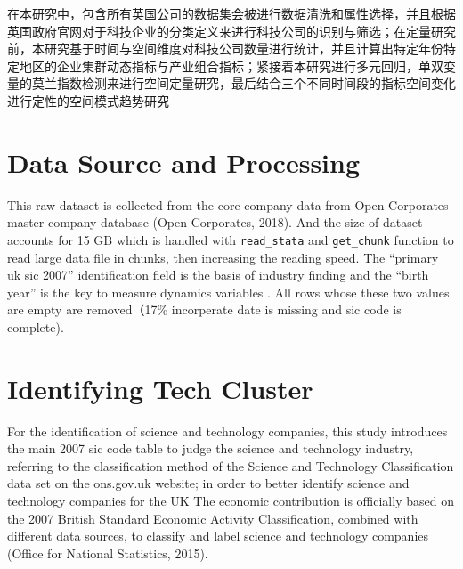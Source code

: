 \documentclass[
  12pt,
  oneside]{book}
\begin{document}
在本研究中，包含所有英国公司的数据集会被进行数据清洗和属性选择，并且根据英国政府官网对于科技企业的分类定义来进行科技公司的识别与筛选；在定量研究前，本研究基于时间与空间维度对科技公司数量进行统计，并且计算出特定年份特定地区的企业集群动态指标与产业组合指标；紧接着本研究进行多元回归，单双变量的莫兰指数检测来进行空间定量研究，最后结合三个不同时间段的指标空间变化进行定性的空间模式趋势研究

\hypertarget{data-source-and-processing}{%
\section{Data Source and Processing}\label{data-source-and-processing}}

This raw dataset is collected from the core company data from Open Corporates master company database (Open Corporates, 2018). And the size of dataset accounts for 15 GB which is handled with \texttt{read\_stata} and \texttt{get\_chunk} function to read large data file in chunks, then increasing the reading speed. The ``primary uk sic 2007'' identification field is the basis of industry finding and the ``birth year'' is the key to measure dynamics variables . All rows whose these two values are empty are removed（17\% incorperate date is missing and sic code is complete).

\hypertarget{identifying-tech-cluster}{%
\section{Identifying Tech Cluster}\label{identifying-tech-cluster}}

For the identification of science and technology companies, this study introduces the main 2007 sic code table to judge the science and technology industry, referring to the classification method of the Science and Technology Classification data set on the ons.gov.uk website; in order to better identify science and technology companies for the UK The economic contribution is officially based on the 2007 British Standard Economic Activity Classification, combined with different data sources, to classify and label science and technology companies (Office for National Statistics, 2015).
\end{document}
